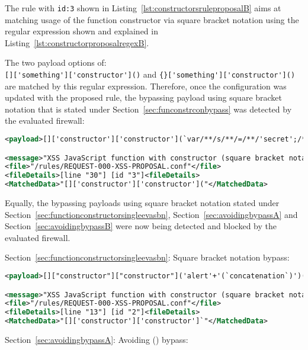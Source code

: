 The rule with \verb|id:3| shown in Listing~\ref{lst:constructorsruleproposalB} aims at matching usage of the function constructor via square bracket notation using the regular expression shown and explained in Listing~\ref{lst:constructorproposalregexB}.

The two payload options of: \\
\verb|[]['something']['constructor']()| and \verb|{}['something']['constructor']()| \\
are matched by this regular expression. Therefore, once the configuration was updated with the proposed rule, the bypassing payload using square bracket notation that is stated under Section~\ref{sec:funconstrconbypass} was detected by the evaluated firewall:

\begin{lstlisting}[style=ruleStyle, language=XML, caption=Function() constructor bypass in square bracket notation blocked, label={lst:constructorsblockedsbn}]
<payload>[]['constructor']['constructor'](`var/**/s/**/=/**/'secret';/**/promp`/**/+/**/`t(s,/**/s)`)()</payload>

<message>"XSS JavaScript function with constructor (square bracket notation)"</message>
<file>"/rules/REQUEST-000-XSS-PROPOSAL.conf"</file>
<fileDetails>[line "30"] [id "3"]<fileDetails>
<MatchedData>"[]['constructor']['constructor']("</MatchedData>
\end{lstlisting}

Equally, the bypassing payloads using square bracket notation stated under Section~\ref{sec:functionconstructorsingleevasbn}, Section~\ref{sec:avoidingbypassA} and Section~\ref{sec:avoidingbypassB} were now being detected and blocked by the evaluated firewall. 

Section~\ref{sec:functionconstructorsingleevasbn}: Square bracket notation bypass:

\begin{lstlisting}[style=ruleStyle, language=XML, caption=Square bracket notation bypass blocked]
<payload>[]["constructor"]["constructor"]('alert'+'(`concatenation`)')()</payload>

<message>"XSS JavaScript function with constructor (square bracket notation)"</message>
<file>"/rules/REQUEST-000-XSS-PROPOSAL.conf"</file>
<fileDetails>[line "13"] [id "2"]<fileDetails>
<MatchedData>"[]['constructor']['constructor']`"</MatchedData>
\end{lstlisting}

Section~\ref{sec:avoidingbypassA}: Avoiding () bypass:


